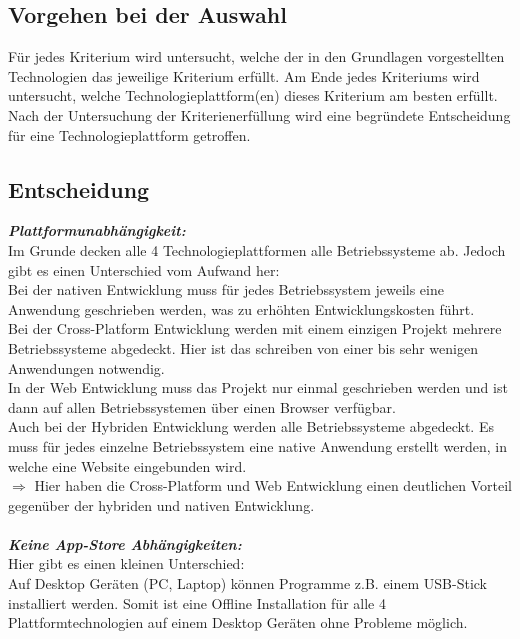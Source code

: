\documentclass[ngerman]{article}
\begin{document}
    \subsection{Vorgehen bei der Auswahl}
    Für jedes Kriterium wird untersucht, welche der in den Grundlagen vorgestellten Technologien das jeweilige Kriterium erfüllt. Am Ende jedes Kriteriums wird untersucht, welche Technologieplattform(en) dieses Kriterium am besten erfüllt.\\
    Nach der Untersuchung der Kriterienerfüllung wird eine begründete Entscheidung für eine Technologieplattform getroffen.
    \subsection{Entscheidung}
    \label{TechnologieplattformEntscheidung}
    \textbf{\textit{Plattformunabhängigkeit:}}\\
    Im Grunde decken alle 4 Technologieplattformen alle Betriebssysteme ab. Jedoch gibt es einen Unterschied vom Aufwand her:\\
    \indent Bei der nativen Entwicklung muss für jedes Betriebssystem jeweils eine Anwendung geschrieben werden, was zu erhöhten Entwicklungskosten führt.\\
    \indent Bei der Cross-Platform Entwicklung werden mit einem einzigen Projekt mehrere Betriebssysteme abgedeckt. Hier ist das schreiben von einer bis sehr wenigen Anwendungen notwendig.\\
    \indent In der Web Entwicklung muss das Projekt nur einmal geschrieben werden und ist dann auf allen Betriebssystemen über einen Browser verfügbar.\\
    \indent Auch bei der Hybriden Entwicklung werden alle Betriebssysteme abgedeckt. Es muss für jedes einzelne Betriebssystem eine native Anwendung erstellt werden, in welche eine Website eingebunden wird.\\
    \indent $\Rightarrow$ Hier haben die Cross-Platform und Web Entwicklung einen deutlichen Vorteil gegenüber der hybriden und nativen Entwicklung.\\\\
    \textbf{\textit{Keine App-Store Abhängigkeiten:}}\\
    Hier gibt es einen kleinen Unterschied:\\
    \indent Auf Desktop Geräten (PC, Laptop) können Programme z.B. einem USB-Stick installiert werden. Somit ist eine Offline Installation für alle 4 Plattformtechnologien auf einem Desktop Geräten ohne Probleme möglich.\\
\end{document}
